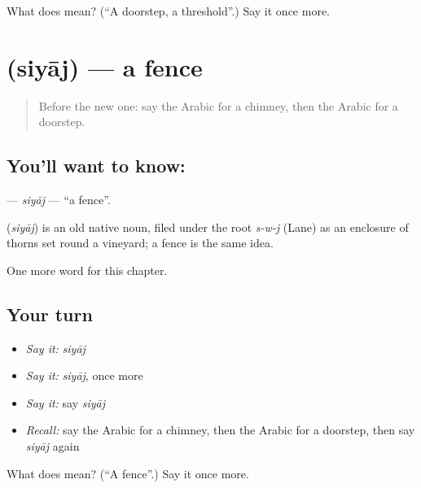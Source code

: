 \begin{tcolorbox}[breakable,colback=teal!4,colframe=teal!35!black,title={Before you move on}]
What does  mean? (\textquotedblleft{}A doorstep, a threshold\textquotedblright{}.) Say it once more.
\end{tcolorbox}
\section[\texorpdfstring{\ar{سياج} (siyāj)}{سياج (siyāj)}]{ (siyāj) — a fence}

\label{lesson:AR-C266-siyaj}



\begin{quote}
Before the new one: say the Arabic for a chimney, then the Arabic for a doorstep.
\end{quote}

\subsection*{You'll want to know: }
\textbf{} — \emph{siyāj} — \textquotedblleft{}a fence\textquotedblright{}.

\begin{cousinweb}
\textbf{} (\emph{siyāj}) is an old native noun, filed under the root \emph{s-w-j} (Lane) as an enclosure of thorns set round a vineyard; a fence is the same idea.
\end{cousinweb}

\begin{grammarlens}[title={What you've built}]
One more word for this chapter.
\end{grammarlens}

\subsection*{Your turn}
\begin{itemize}
\raggedright
  \item \emph{Say it:} \emph{siyāj}
  \item \emph{Say it:} \emph{siyāj}, once more
  \item \emph{Say it:} say \emph{siyāj}
  \item \emph{Recall:} say the Arabic for a chimney, then the Arabic for a doorstep, then say \emph{siyāj} again
\end{itemize}

\begin{tcolorbox}[breakable,colback=teal!4,colframe=teal!35!black,title={Before you move on}]
What does  mean? (\textquotedblleft{}A fence\textquotedblright{}.) Say it once more.
\end{tcolorbox}

